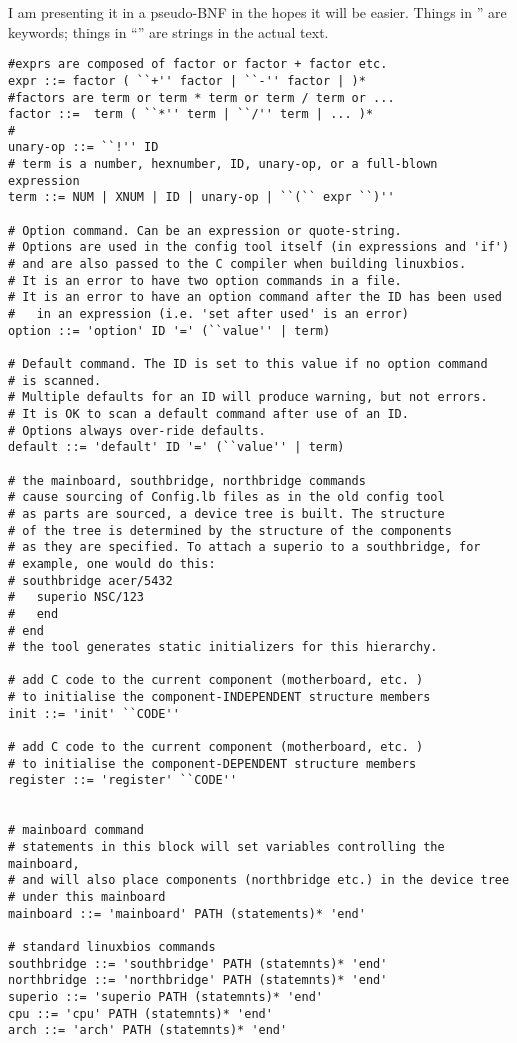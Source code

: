 I am presenting it in a pseudo-BNF in the hopes it will be easier. Things 
in '' are keywords; things in ``'' are strings in the actual text. 
\begin{verbatim}
#exprs are composed of factor or factor + factor etc.
expr ::= factor ( ``+'' factor | ``-'' factor | )*
#factors are term or term * term or term / term or ...
factor ::=  term ( ``*'' term | ``/'' term | ... )*
# 
unary-op ::= ``!'' ID
# term is a number, hexnumber, ID, unary-op, or a full-blown expression
term ::= NUM | XNUM | ID | unary-op | ``(`` expr ``)''

# Option command. Can be an expression or quote-string.
# Options are used in the config tool itself (in expressions and 'if')
# and are also passed to the C compiler when building linuxbios.
# It is an error to have two option commands in a file. 
# It is an error to have an option command after the ID has been used
#   in an expression (i.e. 'set after used' is an error)
option ::= 'option' ID '=' (``value'' | term)

# Default command. The ID is set to this value if no option command
# is scanned. 
# Multiple defaults for an ID will produce warning, but not errors. 
# It is OK to scan a default command after use of an ID.
# Options always over-ride defaults.
default ::= 'default' ID '=' (``value'' | term)

# the mainboard, southbridge, northbridge commands
# cause sourcing of Config.lb files as in the old config tool
# as parts are sourced, a device tree is built. The structure 
# of the tree is determined by the structure of the components
# as they are specified. To attach a superio to a southbridge, for
# example, one would do this:
# southbridge acer/5432 
#   superio NSC/123 
#   end 
# end
# the tool generates static initializers for this hierarchy.

# add C code to the current component (motherboard, etc. )
# to initialise the component-INDEPENDENT structure members
init ::= 'init' ``CODE''

# add C code to the current component (motherboard, etc. )
# to initialise the component-DEPENDENT structure members
register ::= 'register' ``CODE''


# mainboard command
# statements in this block will set variables controlling the mainboard,
# and will also place components (northbridge etc.) in the device tree
# under this mainboard
mainboard ::= 'mainboard' PATH (statements)* 'end'

# standard linuxbios commands
southbridge ::= 'southbridge' PATH (statemnts)* 'end'			
northbridge ::= 'northbridge' PATH (statemnts)* 'end'			
superio ::= 'superio PATH (statemnts)* 'end'			
cpu ::= 'cpu' PATH (statemnts)* 'end'			
arch ::= 'arch' PATH (statemnts)* 'end'			


\end{verbatim}
